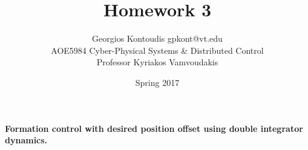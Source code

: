 \documentclass[12pt]{article}
\newenvironment{exercise}[2][Exercise]{\begin{trivlist}
\item[\hskip \labelsep {\bfseries #1}\hskip \labelsep {\bfseries #2.}]}{\end{trivlist}}
\begin{document}
 
 
\title{Homework 3}
\author{Georgios Kontoudis \textbullet{} gpkont@vt.edu\\ 
AOE5984 Cyber-Physical Systems \& Distributed Control\\
Professor Kyriakos Vamvoudakis} 
\date{Spring 2017}
 
\maketitle
\begin{exercise}{1} %
\textbf{Formation control with desired position offset using double integrator dynamics.}
\end{exercise}
\end{document}
